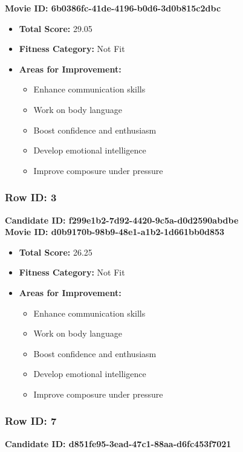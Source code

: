 \documentclass{article}
\begin{document}
\textbf{Movie ID: 6b0386fc-41de-4196-b0d6-3d0b815c2dbc}

\begin{itemize}
    \item \textbf{Total Score:} 29.05
    \item \textbf{Fitness Category:} Not Fit
    \item \textbf{Areas for Improvement:}
    \begin{itemize}
        \item Enhance communication skills
        \item Work on body language
        \item Boost confidence and enthusiasm
        \item Develop emotional intelligence
        \item Improve composure under pressure
    \end{itemize}
\end{itemize}

\subsubsection{Row ID: 3}
\textbf{Candidate ID: f299e1b2-7d92-4420-9c5a-d0d2590abdbe}\\

\textbf{Movie ID: d0b9170b-98b9-48e1-a1b2-1d661bb0d853}
\begin{itemize}
    \item \textbf{Total Score:} 26.25
    \item \textbf{Fitness Category:} Not Fit
    \item \textbf{Areas for Improvement:}
    \begin{itemize}
        \item Enhance communication skills
        \item Work on body language
        \item Boost confidence and enthusiasm
        \item Develop emotional intelligence
        \item Improve composure under pressure
    \end{itemize}
\end{itemize}

\subsubsection{Row ID: 7}
\textbf{Candidate ID: d851fe95-3ead-47c1-88aa-d6fc453f7021}\\
\end{document}
